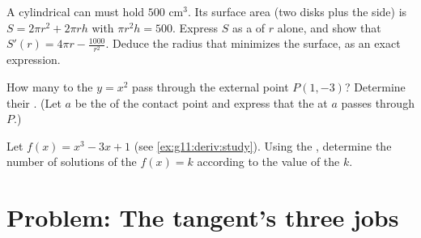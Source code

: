 \begin{exercise}[$\star\star$]\label{exo:g11:deriv:10}
A cylindrical can must hold $500$ cm$^3$. Its surface area (two disks plus
the side) is $S = 2\pi r^2 + 2\pi r h$ with $\pi r^2 h = 500$. Express $S$
as a  of $r$ alone, and show that $S'(r) = 4\pi r -
\frac{1000}{r^2}$. Deduce the radius that minimizes the surface, as an
exact expression.
\end{exercise}

\begin{exercise}[$\star\star\star$]\label{exo:g11:deriv:11}
How many  to the  $y = x^2$ pass through the external
point $P(1, -3)$? Determine their . (Let $a$ be the  of
the contact point and express that the  at $a$ passes through $P$.)
\end{exercise}

\begin{exercise}[$\star\star\star$]\label{exo:g11:deriv:12}
Let $f(x) = x^3 - 3x + 1$ (see \cref{ex:g11:deriv:study}). Using the
, determine the number of solutions of the 
$f(x) = k$ according to the value of the  $k$.
\end{exercise}

\section{Problem: The tangent's three jobs}


